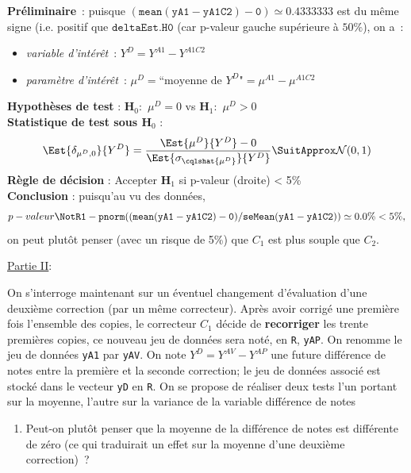 \documentclass[10pt]{report}
\begin{document}
\begin{exercice}
\begin{enumerate}
 

\begin{Correction}
\noindent \textbf{Préliminaire}~: puisque  $\mathtt{(mean(yA1-yA1C2)-0)}\simeq0.4333333$ est du même signe (i.e. positif que $\mathtt{deltaEst.H0}$ (car p-valeur gauche supérieure à $50\%$), on a~:
    \begin{itemize}
\item \textit{variable d'intérêt}~: $Y^{D}=Y^{A1}-Y^{A1C2}$
\item \textit{paramètre d'intérêt}~: $\mu^{D}=\mbox{``moyenne de $Y^{D}$"}=\mu^{A1}-\mu^{A1C2}$
\end{itemize}
\noindent \textbf{Hypothèses de test} : $\mathbf{H}_0:$ $\mu^{D}=0$ vs {\large $\mathbf{H}_1:$ $\mu^{D}>0$}\\
\textbf{Statistique de test sous $\mathbf{H}_0$} :
  $$
  \Est{\delta_{\mu^{D},0}}{Y^{D}}= {\displaystyle \frac{\Est{\mu^{D}}{Y^{D}}-0}{
\Est{\sigma_{\cqlshat{\mu^{D}}}}{Y^{D}}
}} 
  \SuitApprox \mathcal{N}(0,1)
  $$
\textbf{Règle de décision} : Accepter $\mathbf{H}_1$ si 
  p-valeur (droite) < 5\%\\
\noindent \textbf{Conclusion} :
puisqu'au vu des données, 
  \[
p-valeur\NotR\mathtt{1-pnorm((mean(yA1-yA1C2)-0)/seMean(yA1-yA1C2))} \simeq 0.0\% < 5\%,
\]
on peut plutôt penser (avec un risque de 5\%) que $C_1$ est plus souple que $C_2$.
\end{Correction}




\end{enumerate}

\noindent \underline{Partie II}:


On s'interroge maintenant sur un éventuel changement d'évaluation d'une deuxième correction (par un même correcteur). Après avoir corrigé une première fois l'ensemble des copies, le correcteur $C_1$ décide de \textbf{recorriger} les trente premières copies, ce nouveau jeu de données sera noté, en \texttt{R}, \texttt{yAP}. On renomme le jeu de données \texttt{yA1} par \texttt{yAV}. On note $Y^D=Y^{AV}-Y^{AP}$ une future différence de notes entre la première et la seconde correction; le jeu de données associé est stocké dans le vecteur \texttt{yD} en \texttt{R}. On se propose de réaliser deux tests l'un portant sur la moyenne, l'autre sur la variance de la variable différence de notes

\begin{enumerate}
\item Peut-on plutôt penser que la moyenne de la différence de notes est différente de zéro (ce qui traduirait un effet sur la moyenne d'une deuxième correction)~?


\end{enumerate}
\end{exercice}
\end{document}

